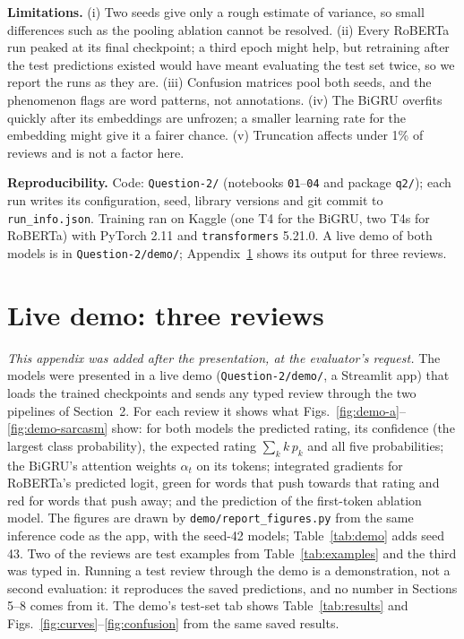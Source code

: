 \documentclass[10pt,a4paper]{article}
\newcommand{\code}[1]{\texttt{#1}}
\begin{document}
\textbf{Limitations.} (i) Two seeds give only a rough estimate of variance, so small differences such as the pooling
ablation cannot be resolved. (ii) Every RoBERTa run peaked at its final checkpoint; a third epoch might help, but
retraining after the test predictions existed would have meant evaluating the test set twice, so we report the runs
as they are. (iii) Confusion matrices pool both seeds, and the phenomenon flags are word patterns, not annotations.
(iv) The BiGRU overfits quickly after its embeddings are unfrozen; a smaller learning rate for the embedding might give
it a fairer chance. (v) Truncation affects under 1\% of reviews and is not a factor here.

\textbf{Reproducibility.} Code: \code{Question-2/} (notebooks \code{01}--\code{04} and package \code{q2/}); each run
writes its configuration, seed, library versions and git commit to \code{run\_info.json}. Training ran on Kaggle (one
T4 for the BiGRU, two T4s for RoBERTa) with PyTorch 2.11 and \code{transformers} 5.21.0. A live demo of both models is
in \code{Question-2/demo/}; Appendix~\ref{app:demo} shows its output for three reviews.

\appendix
\section{Live demo: three reviews}
\label{app:demo}

\emph{This appendix was added after the presentation, at the evaluator's request.} The models were presented in a live
demo (\code{Question-2/demo/}, a Streamlit app) that loads the trained checkpoints and sends any typed review through
the two pipelines of Section~2. For each review it shows what Figs.~\ref{fig:demo-a}--\ref{fig:demo-sarcasm} show: for
both models the predicted rating, its confidence (the largest class probability), the expected rating $\sum_k k\,p_k$
and all five probabilities; the BiGRU's attention weights $\alpha_t$ on its tokens; integrated gradients for RoBERTa's
predicted logit, green for words that push towards that rating and red for words that push away; and the prediction of
the first-token ablation model. The figures are drawn by \code{demo/report\_figures.py} from the same inference code as
the app, with the seed-42 models; Table~\ref{tab:demo} adds seed 43. Two of the reviews are test examples from
Table~\ref{tab:examples} and the third was typed in. Running a test review through the demo is a demonstration, not a
second evaluation: it reproduces the saved predictions, and no number in Sections 5--8 comes from it. The demo's
test-set tab shows Table~\ref{tab:results} and Figs.~\ref{fig:curves}--\ref{fig:confusion} from the same saved results.
\end{document}
